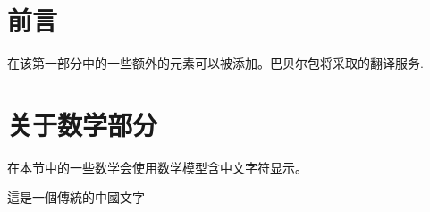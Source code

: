 \documentclass{article}
\begin{document}
 
\section{前言}
在该第一部分中的一些额外的元素可以被添加。巴贝尔包将采取的翻译服务.
 
\section{关于数学部分}
在本节中的一些数学会使用数学模型含中文字符显示。
 
\vspace{0.5cm}
 
這是一個傳統的中國文字
\end{document}
